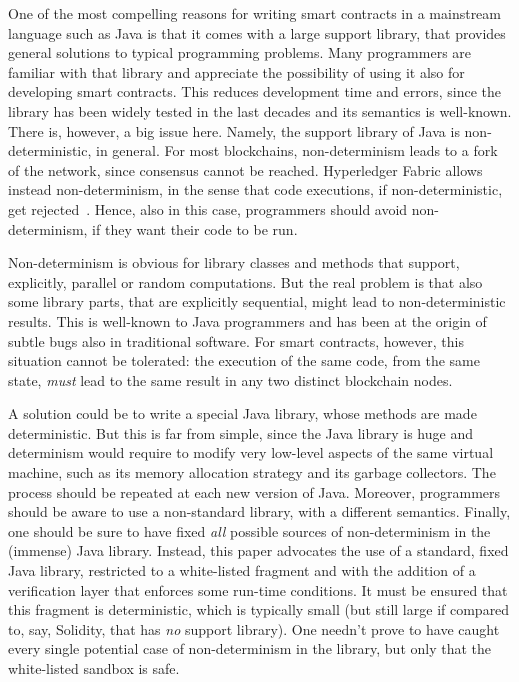 One of the most compelling reasons for writing smart contracts
in a mainstream language such as Java is that it comes with a large
support library, that provides general solutions to typical programming problems.
Many programmers are familiar with that library and appreciate the possibility
of using it also for developing smart contracts. This reduces
development time and errors, since the library has been widely tested
in the last decades and its semantics is well-known. There is, however, a big
issue here. Namely, the support library of Java is non-deterministic, in general.
For most blockchains, non-determinism leads to a fork of the network, since
consensus cannot be reached. Hyperledger Fabric allows instead non-determinism,
in the sense that code executions, if non-deterministic, get rejected~\cite{Vukolic17}.
Hence, also in this case, programmers should avoid non-determinism, if they want their code to be run.

Non-determinism is obvious for library classes and methods that support, explicitly,
parallel or random computations. But the real problem is that
also some library parts, that are explicitly sequential, might lead to
non-deterministic results.
This is well-known to Java programmers and has been at the origin of subtle
bugs also in traditional software. For smart contracts, however,
this situation cannot be tolerated: the execution of the same code, from the same state,
\emph{must} lead to the same result in any two distinct blockchain nodes.

A solution could be to write a special Java library, whose
methods are made deterministic. But this is far from simple, since the Java library is huge
and determinism would require to modify very low-level aspects of the same virtual machine, such as
its memory allocation strategy and its garbage collectors.
The process should be repeated at each new version of Java.
Moreover, programmers should be aware to use a non-standard library, with a different semantics.
Finally, one should be sure to have fixed \emph{all} possible sources of non-determinism in the
(immense) Java library.
Instead, this paper advocates the use of a standard, fixed Java library, restricted to a white-listed
fragment and with the addition of a verification layer that enforces some run-time conditions.
It must be ensured that this fragment is deterministic, which is typically small (but still
large if compared to, say, Solidity, that has \emph{no} support library). One needn't prove
to have caught every single potential case of non-determinism in the library, but only that
the white-listed sandbox is safe.

